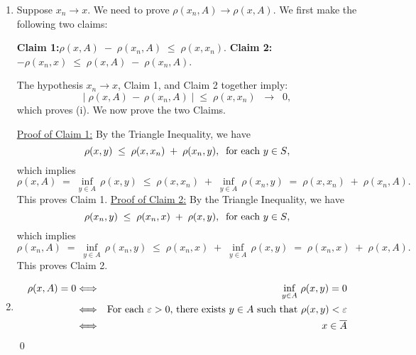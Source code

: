 \begin{enumerate}
\item
	Suppose $x_{n} \longrightarrow x$. We need to prove $\rho(x_{n},A) \longrightarrow \rho(x,A)$.
	We first make the following two claims:

	\vskip 0.5cm
	\begin{center}
	\begin{minipage}{6.0in}
	\noindent
	\textbf{Claim 1:}\quad$\rho(x,A) \;-\; \rho(x_{n},A) \;\leq\; \rho(x,x_{n})$.
	\vskip 0.2cm
	\textbf{Claim 2:}\quad$- \rho(x_{n},x) \;\leq\; \rho(x,A) \;-\; \rho(x_{n},A)$.
	\end{minipage}
	\end{center}

	\vskip 0.1cm
	\noindent
	The hypothesis $x_{n} \longrightarrow x$, Claim 1, and Claim 2 together imply:
	\begin{equation*}
	\left\vert\;\rho(x,A) \,-\, \rho(x_{n},A)\;\right\vert \; \leq \; \rho(x,x_{n})
	\;\;\longrightarrow\;\;0,
	\end{equation*}
	which proves (i). We now prove the two Claims.

	\vskip 0.2cm
	\noindent
	\underline{Proof of Claim 1:}\quad
	By the Triangle Inequality, we have
	\begin{equation*}
	\rho(x,y) \;\leq\; \rho(x,x_{n}) \;+\; \rho(x_{n},y),
	\;\;\textnormal{for each $y \in S$},
	\end{equation*}
	which implies
	\begin{equation*}
	\rho(x,A) \;=\; \inf_{y \in A}\,\rho(x,y) \;\leq\; \rho(x,x_{n}) \;+\; \inf_{y \in A}\,\rho(x_{n},y) \;=\; \rho(x,x_{n}) \;+\; \rho(x_{n},A).
	\end{equation*}
	This proves Claim 1.
	\vskip 0.5cm
	\noindent
	\underline{Proof of Claim 2:}\quad
	By the Triangle Inequality, we have
	\begin{equation*}
	\rho(x_{n},y) \;\leq\; \rho(x_{n},x) \;+\; \rho(x,y),
	\;\;\textnormal{for each $y \in S$},
	\end{equation*}
	which implies
	\begin{equation*}
	\rho(x_{n},A) \;=\; \inf_{y \in A}\,\rho(x_{n},y) \;\leq\; \rho(x_{n},x) \;+\; \inf_{y \in A}\,\rho(x,y) \;=\; \rho(x_{n},x) \;+\; \rho(x,A).
	\end{equation*}
	This proves Claim 2.

\item
	\begin{eqnarray*}
	\rho(x,A) = 0
	&\Longleftrightarrow& \inf_{y\in A}\,\rho(x,y) = 0
	\\
	&\Longleftrightarrow& \textnormal{For each $\varepsilon > 0$, there exists $y \in A$ such that $\rho(x,y) < \varepsilon$}
	\\
	&\Longleftrightarrow& x \in \overline{A}
	\end{eqnarray*}
\qed
\end{enumerate}

